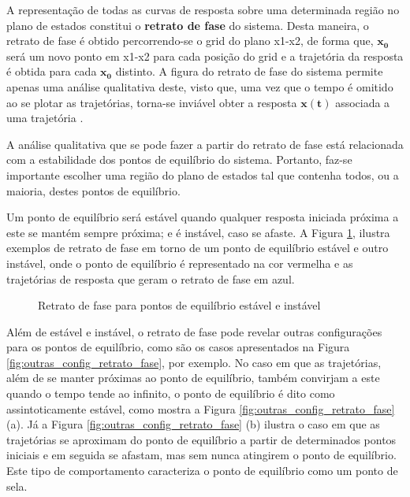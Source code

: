 A representação de todas as curvas de resposta sobre uma determinada região no plano de estados constitui o\textbf{ retrato de fase} do sistema\cite{bookkhalil:2003}. Desta maneira, o retrato de fase é obtido percorrendo-se o grid do plano x1-x2, de forma que, $\mathbf{x_0}$ será um novo ponto em x1-x2 para cada posição do grid e a trajetória da resposta é obtida para cada $\mathbf{x_0}$ distinto. A figura do retrato de fase do sistema permite apenas uma análise qualitativa deste, visto que, uma vez que o tempo é omitido ao se plotar as trajetórias, torna-se inviável obter a resposta $\mathbf{x(t)}$ associada a uma trajetória \cite{bookkhalil:2003}.

A análise qualitativa que se pode fazer a partir do retrato de fase está relacionada com a estabilidade dos pontos de equilíbrio do sistema. Portanto, faz-se importante escolher uma região do plano de estados tal que contenha todos, ou a maioria, destes pontos de equilíbrio.

Um ponto de equilíbrio será estável quando qualquer resposta iniciada próxima a este se mantém sempre próxima; e é instável, caso se afaste. A Figura \ref{fig:pontos_eq_retrato_fase}, ilustra exemplos de retrato de fase em torno de um ponto de equilíbrio estável e outro instável, onde o ponto de equilíbrio é representado na cor vermelha e as trajetórias de resposta que geram o retrato de fase em azul.

\begin{figure}[htbp]
	\centering
	\qquad
	\caption{Retrato de fase para pontos de equilíbrio estável e instável}
	\label{fig:pontos_eq_retrato_fase}
\end{figure}

Além de estável e instável, o retrato de fase pode revelar outras configurações para os pontos de equilíbrio, como são os casos apresentados na Figura \ref{fig:outras_config_retrato_fase}, por exemplo.
No caso em que as trajetórias, além de se manter próximas ao ponto de equilíbrio, também convirjam a este quando o tempo tende ao infinito, o ponto de equilíbrio é dito como assintoticamente estável, como mostra a Figura \ref{fig:outras_config_retrato_fase} (a).
Já a Figura \ref{fig:outras_config_retrato_fase} (b) ilustra o caso em que as trajetórias se aproximam do ponto de equilíbrio a partir de determinados pontos iniciais e em seguida se afastam, mas sem nunca atingirem o ponto de equilíbrio. Este tipo de comportamento caracteriza o ponto de equilíbrio como um ponto de sela. 

